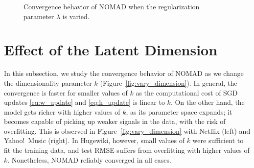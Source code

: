 \documentclass{vldb}
\begin{document}
\begin{figure*}[htbp]

  \caption{Convergence behavior of NOMAD when the regularization
    parameter $\lambda$ is varied.}
  \label{fig:vary_regularization}
\end{figure*}


\section{Effect of the Latent Dimension}
\label{sec:EffectLatentDimens}

In this subsection, we study the convergence behavior of NOMAD
as we change the dimensionality parameter $k$
(Figure~\ref{fig:vary_dimension}).  In general, the convergence is
faster for smaller values of $k$ as the computational cost of SGD
updates \eqref{eq:w_update} and \eqref{eq:h_update} is linear to $k$.
On the other hand, the model gets richer with higher values of $k$, as
its parameter space expands; it becomes capable of picking up weaker
signals in the data, with the risk of overfitting.  This is observed
in Figure~\ref{fig:vary_dimension} with Netflix (left) and
Yahoo!~Music (right).  In Hugewiki, however, small
values of $k$ were sufficient to fit the training data, and test RMSE
suffers from overfitting with higher values of $k$.  Nonetheless,
NOMAD reliably converged in all cases.
\end{document}
